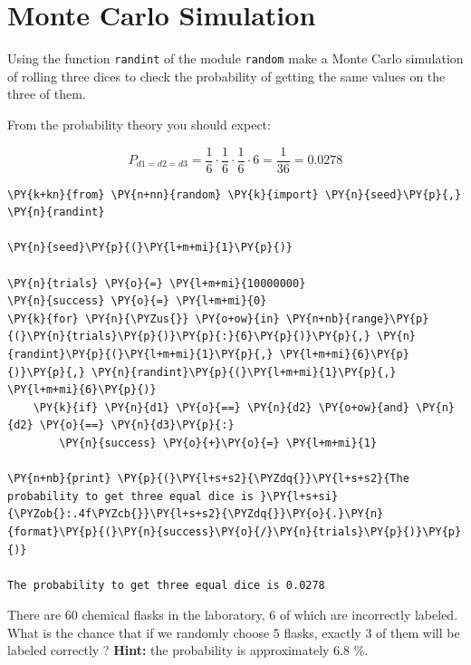 \chapter{Monte Carlo Simulation}\label{introduction-to-python---lesson-8}

\begin{Exercise}[title={(Dice Simulation)}]
Using the function \texttt{randint} of the module \texttt{random} make a
Monte Carlo simulation of rolling three dices to check the probability
of getting the same values on the three of them.

From the probability theory you should expect:

\[P_{d1=d2=d3} = \frac{1}{6}\cdot\frac{1}{6}\cdot\frac{1}{6}\cdot 6 = \frac{1}{36} = 0.0278\]
\end{Exercise}
\begin{Answer}
\begin{tcolorbox}[size=fbox, boxrule=1pt, colback=cellbackground, colframe=cellborder]
\begin{Verbatim}[commandchars=\\\{\}]
\PY{k+kn}{from} \PY{n+nn}{random} \PY{k}{import} \PY{n}{seed}\PY{p}{,} \PY{n}{randint}
        
\PY{n}{seed}\PY{p}{(}\PY{l+m+mi}{1}\PY{p}{)}
        
\PY{n}{trials} \PY{o}{=} \PY{l+m+mi}{10000000}
\PY{n}{success} \PY{o}{=} \PY{l+m+mi}{0}
\PY{k}{for} \PY{n}{\PYZus{}} \PY{o+ow}{in} \PY{n+nb}{range}\PY{p}{(}\PY{n}{trials}\PY{p}{)}\PY{p}{:}{6}\PY{p}{)}\PY{p}{,} \PY{n}{randint}\PY{p}{(}\PY{l+m+mi}{1}\PY{p}{,} \PY{l+m+mi}{6}\PY{p}{)}\PY{p}{,} \PY{n}{randint}\PY{p}{(}\PY{l+m+mi}{1}\PY{p}{,} \PY{l+m+mi}{6}\PY{p}{)}    
    \PY{k}{if} \PY{n}{d1} \PY{o}{==} \PY{n}{d2} \PY{o+ow}{and} \PY{n}{d2} \PY{o}{==} \PY{n}{d3}\PY{p}{:}
        \PY{n}{success} \PY{o}{+}\PY{o}{=} \PY{l+m+mi}{1}
    
\PY{n+nb}{print} \PY{p}{(}\PY{l+s+s2}{\PYZdq{}}\PY{l+s+s2}{The probability to get three equal dice is }\PY{l+s+si}{\PYZob{}:.4f\PYZcb{}}\PY{l+s+s2}{\PYZdq{}}\PY{o}{.}\PY{n}{format}\PY{p}{(}\PY{n}{success}\PY{o}{/}\PY{n}{trials}\PY{p}{)}\PY{p}{)}
        
The probability to get three equal dice is 0.0278
\end{Verbatim}
\end{tcolorbox}
\end{Answer}

\begin{Exercise}[title={(Monte Carlo Simulation II}]
There are 60 chemical flasks in the laboratory, 6 of which are incorrectly labeled. What is the chance that if we randomly choose 5 flasks, exactly 3 of them will be labeled correctly ?
\textbf{Hint:} the probability is approximately 6.8 \%.
\end{Exercise}

